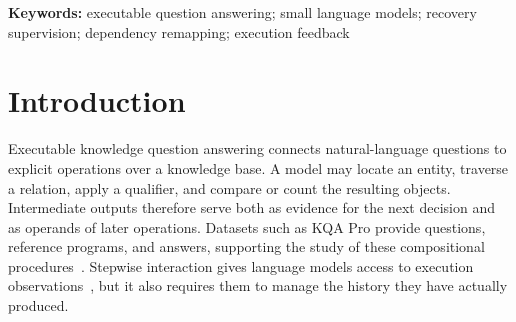 \begin{abstract}
Small language models performing multi-step knowledge queries must continue solving after their generated histories depart from successful demonstrations. An extra executable action can also change intermediate-result identifiers, making direct reuse of a reference suffix unreliable. We present a dependency-consistent recovery-supervision construction for executable knowledge question answering. A fixed initial model produces unsuccessful training episodes; a shared successful prefix and one actual divergent action are retained; reference dependencies are remapped to current result handles; and execution replay checks the resulting continuation. Training supervises the continuation while preserving the divergent history as context. Using Qwen2.5-3B-Instruct with LoRA, we compare recovery continuation against ordinary continuation with the same initialization, successful examples, question order, and supervised-token budget. On a project-held-out set of 2,000 KQA Pro questions, mean accuracy across two paired continuation seeds increases from 78.75\% to 83.50\%, a gain of 4.75 percentage points with a question-paired 95\% bootstrap interval of $[3.53,5.98]$. Unfinished episodes and invalid calls decrease, and cumulative inference tokens decrease by 8.84\% and 4.17\% relative to the matched stepwise controls. A separate offline diagnostic of saved training histories identifies dependency mismatches under direct suffix splicing. The results support reference-program-based recovery supervision in deterministic, read-only query environments.
\end{abstract}

\noindent\textbf{Keywords:} executable question answering; small language models; recovery supervision; dependency remapping; execution feedback

\section{Introduction}

Executable knowledge question answering connects natural-language questions to explicit operations over a knowledge base. A model may locate an entity, traverse a relation, apply a qualifier, and compare or count the resulting objects. Intermediate outputs therefore serve both as evidence for the next decision and as operands of later operations. Datasets such as KQA Pro provide questions, reference programs, and answers, supporting the study of these compositional procedures~\cite{cao2022kqapro}. Stepwise interaction gives language models access to execution observations~\cite{yao2023react}, but it also requires them to manage the history they have actually produced.


